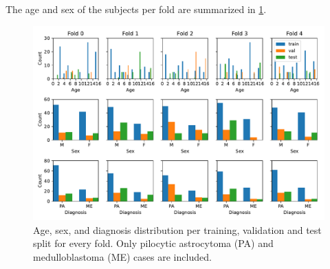 The age and sex of the subjects per fold are summarized in \cref{fig:age-and-sex-diagnosis}.

\begin{figure}
    \centering
    \includegraphics[width=\linewidth]{pediatric-brain-tumours/images/age-and-sex-diagnosis-per-fold.pdf}
    \caption[Age and sex distribution]{Age, sex, and diagnosis distribution per training, validation and test split for every fold.
    Only pilocytic astrocytoma (PA) and medulloblastoma (ME) cases are included.}
    \label{fig:age-and-sex-diagnosis}
\end{figure}